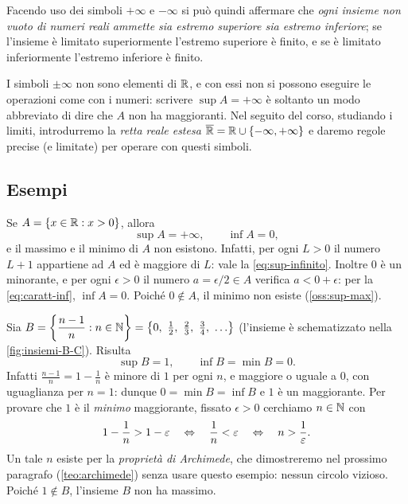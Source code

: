 Facendo uso dei simboli $+\infty$ e $-\infty$ si può quindi affermare che \emph{ogni
insieme non vuoto di numeri reali ammette sia estremo superiore sia estremo inferiore};
se l'insieme è limitato superiormente l'estremo superiore è finito, e se è limitato
inferiormente l'estremo inferiore è finito.

\begin{attenzione}
I simboli $\pm\infty$ non sono elementi di $\mathbb{R}$, e con essi non si possono eseguire le
operazioni come con i numeri: scrivere $\sup A=+\infty$ è soltanto un modo abbreviato di
dire che $A$ non ha maggioranti. Nel seguito del corso, studiando i limiti, introdurremo
la \emph{retta reale estesa} $\overline{\mathbb{R}}=\mathbb{R}\cup\{-\infty,+\infty\}$ e daremo regole
precise (e limitate) per operare con questi simboli.
\end{attenzione}

\subsection{Esempi}

\begin{esempio}\label{es:sup-semiretta}
Se $A=\{x\in\mathbb{R} : x>0\}$, allora
\begin{equation}\label{eq:es-semiretta}
  \sup A=+\infty, \qquad \inf A=0,
\end{equation}
e il massimo e il minimo di $A$ non esistono. Infatti, per ogni $L>0$ il numero $L+1$
appartiene ad $A$ ed è maggiore di $L$: vale la \eqref{eq:sup-infinito}. Inoltre $0$ è
un minorante, e per ogni $\epsilon>0$ il numero $a=\epsilon/2\in A$ verifica
$a<0+\epsilon$: per la \eqref{eq:caratt-inf}, $\inf A=0$. Poiché $0\notin A$, il minimo
non esiste (\cref{oss:sup-max}).
\end{esempio}

\begin{esempio}\label{es:sup-B}
Sia $B=\set{\dfrac{n-1}{n} : n\in\N}=\set{0,\ \tfrac12,\ \tfrac23,\ \tfrac34,\ \dots}$
(l'insieme è schematizzato nella \cref{fig:insiemi-B-C}). Risulta
\begin{equation}\label{eq:es-B}
  \sup B=1, \qquad \inf B=\min B=0.
\end{equation}
Infatti $\frac{n-1}{n}=1-\frac1n$ è minore di $1$ per ogni $n$, e maggiore o uguale a
$0$, con uguaglianza per $n=1$: dunque $0=\min B=\inf B$ e $1$ è un maggiorante. Per
provare che $1$ è il \emph{minimo} maggiorante, fissato $\epsilon>0$ cerchiamo
$n\in\mathbb{N}$ con
\[
  1-\frac1n>1-\varepsilon \quad\Leftrightarrow\quad \frac1n<\varepsilon \quad\Leftrightarrow\quad n>\frac1{\varepsilon} .
\]
Un tale $n$ esiste per la \emph{proprietà di Archimede}, che dimostreremo nel prossimo
paragrafo (\cref{teo:archimede}) senza usare questo esempio: nessun circolo vizioso.
Poiché $1\notin B$, l'insieme $B$ non ha massimo.
\end{esempio}

